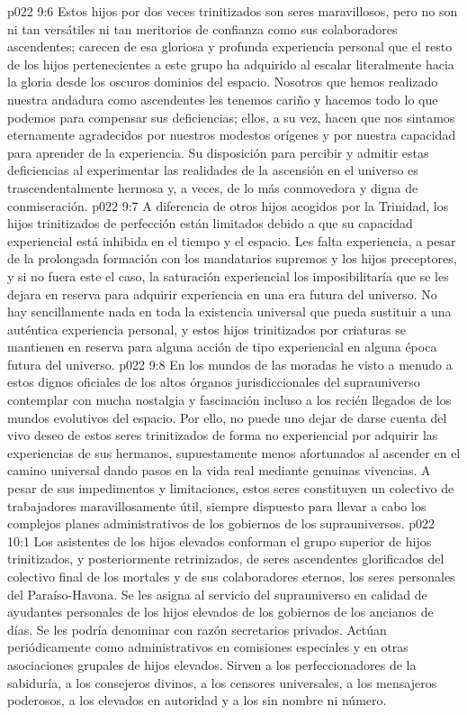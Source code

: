 \vs p022 9:6 Estos hijos por dos veces trinitizados son seres maravillosos, pero no son ni tan versátiles ni tan meritorios de confianza como sus colaboradores ascendentes; carecen de esa gloriosa y profunda experiencia personal que el resto de los hijos pertenecientes a este grupo ha adquirido al escalar literalmente hacia la gloria desde los oscuros dominios del espacio. Nosotros que hemos realizado nuestra andadura como ascendentes les tenemos cariño y hacemos todo lo que podemos para compensar sus deficiencias; ellos, a su vez, hacen que nos sintamos eternamente agradecidos por nuestros modestos orígenes y por nuestra capacidad para aprender de la experiencia. Su disposición para percibir y admitir estas deficiencias al experimentar las realidades de la ascensión en el universo es trascendentalmente hermosa y, a veces, de lo más conmovedora y digna de conmiseración.
\vs p022 9:7 A diferencia de otros hijos acogidos por la Trinidad, los hijos trinitizados de perfección están limitados debido a que su capacidad experiencial está inhibida en el tiempo y el espacio. Les falta experiencia, a pesar de la prolongada formación con los mandatarios supremos y los hijos preceptores, y si no fuera este el caso, la saturación experiencial los imposibilitaría que se les dejara en reserva para adquirir experiencia en una era futura del universo. No hay sencillamente nada en toda la existencia universal que pueda sustituir a una auténtica experiencia personal, y estos hijos trinitizados por criaturas se mantienen en reserva para alguna acción de tipo experiencial en alguna época futura del universo.
\vs p022 9:8 En los mundos de las moradas he visto a menudo a estos dignos oficiales de los altos órganos jurisdiccionales del suprauniverso contemplar con mucha nostalgia y fascinación incluso a los recién llegados de los mundos evolutivos del espacio. Por ello, no puede uno dejar de darse cuenta del vivo deseo de estos seres trinitizados de forma no experiencial por adquirir las experiencias de sus hermanos, supuestamente menos afortunados al ascender en el camino universal dando pasos en la vida real mediante genuinas vivencias. A pesar de sus impedimentos y limitaciones, estos seres constituyen un colectivo de trabajadores maravillosamente útil, siempre dispuesto para llevar a cabo los complejos planes administrativos de los gobiernos de los suprauniversos.
\vs p022 10:1 Los asistentes de los hijos elevados conforman el grupo superior de hijos trinitizados, y posteriormente retrinizados, de seres ascendentes glorificados del colectivo final de los mortales y de sus colaboradores eternos, los seres personales del Paraíso\hyp{}Havona. Se les asigna al servicio del suprauniverso en calidad de ayudantes personales de los hijos elevados de los gobiernos de los ancianos de días. Se les podría denominar con razón secretarios privados. Actúan periódicamente como administrativos en comisiones especiales y en otras asociaciones grupales de hijos elevados. Sirven a los perfeccionadores de la sabiduría, a los consejeros divinos, a los censores universales, a los mensajeros poderosos, a los elevados en autoridad y a los sin nombre ni número.
